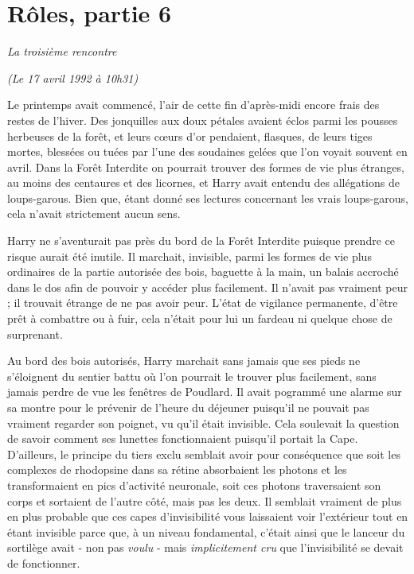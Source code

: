 
\chapter{Rôles, partie 6}

\emph{La troisième rencontre} 

\emph{(Le 17 avril 1992 à 10h31)} 

Le printemps avait commencé, l'air de cette fin d'après-midi encore frais des restes de l'hiver. Des jonquilles aux doux pétales avaient éclos parmi les pousses herbeuses de la forêt, et leurs cœurs d'or pendaient, flasques, de leurs tiges mortes, blessées ou tuées par l'une des soudaines gelées que l'on voyait souvent en avril. Dans la Forêt Interdite on pourrait trouver des formes de vie plus étranges, au moins des centaures et des licornes, et Harry avait entendu des allégations de loups-garous. Bien que, étant donné ses lectures concernant les vrais loups-garous, cela n'avait strictement aucun sens.

Harry ne s'aventurait pas près du bord de la Forêt Interdite puisque prendre ce risque aurait été inutile. Il marchait, invisible, parmi les formes de vie plus ordinaires de la partie autorisée des bois, baguette à la main, un balais accroché dans le dos afin de pouvoir y accéder plus facilement. Il n'avait pas vraiment peur ; il trouvait étrange de ne pas avoir peur. L'état de vigilance permanente, d'être prêt à combattre ou à fuir, cela n'était pour lui un fardeau ni quelque chose de surprenant.

Au bord des bois autorisés, Harry marchait sans jamais que ses pieds ne s'éloignent du sentier battu où l'on pourrait le trouver plus facilement, sans jamais perdre de vue les fenêtres de Poudlard. Il avait pogrammé une alarme sur sa montre pour le prévenir de l'heure du déjeuner puisqu'il ne pouvait pas vraiment regarder son poignet, vu qu'il était invisible. Cela soulevait la question de savoir comment ses lunettes fonctionnaient puisqu'il portait la Cape. D'ailleurs, le principe du tiers exclu semblait avoir pour conséquence que soit les complexes de rhodopsine dans sa rétine absorbaient les photons et les transformaient en pics d'activité neuronale, soit ces photons traversaient son corps et sortaient de l'autre côté, mais pas les deux. Il semblait vraiment de plus en plus probable que ces capes d'invisibilité vous laissaient voir l'extérieur tout en étant invisible parce que, à un niveau fondamental, c'était ainsi que le lanceur du sortilège avait - non pas \emph{voulu}  - mais \emph{implicitement cru}  que l'invisibilité se devait de fonctionner.

